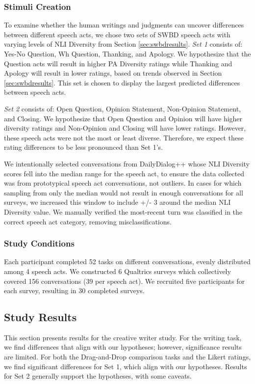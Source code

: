 \documentclass[11pt]{article}
\newcommand{\edivshortspace}{PA Diversity }
\begin{document}
\subsubsection{Stimuli Creation}
To examine whether the human writings and judgments can uncover differences between different speech acts, we chose two sets of SWBD speech acts
with varying levels of NLI Diversity from Section \ref{sec:swbdresults}.  
\textit{Set 1} consists of:  Yes-No Question, Wh Question, Thanking, and Apology.  We hypothesize that the Question acts will result in higher \edivshortspace ratings while Thanking and Apology will result in lower ratings, based on trends observed in Section \ref{sec:swbdresults}.  
This set is chosen to display the largest predicted differences between speech acts.

\textit{Set 2} consists of:  Open Question, Opinion Statement, Non-Opinion Statement, and Closing.  We hypothesize that Open Question and Opinion will have higher diversity ratings and Non-Opinion and Closing will have lower ratings.  However, these speech acts were not the most or least diverse.
Therefore, we expect these rating differences to be less pronounced than Set 1's.

We intentionally selected conversations from DailyDialog++ whose NLI Diversity scores
fell into the median range for the speech act, to 
ensure the data collected was from prototypical speech act conversations, not  outliers.  In cases for which sampling from only the median would not result in enough conversations for all surveys, we increased this window to include +/- 3 around the median NLI Diversity value. 
We manually verified the most-recent  turn was classified in the correct speech act category, removing misclassifications.

\subsubsection{Study Conditions}

Each participant completed 52 tasks on different conversations,  evenly distributed among 4 speech acts. 
We constructed 6 Qualtrics surveys which collectively covered 156 conversations (39 per speech act).
We recruited five participants for each survey, resulting in 30 completed surveys. 


\subsection{ Study Results}\label{sec:writer_results}
This section presents results for the 
creative writer study.
For the writing task, we find differences that align with our hypotheses; however, significance results are limited.
For both the Drag-and-Drop comparison tasks and the Likert ratings,  we find significant differences for Set 1,  which align with our hypotheses.  Results for Set 2 generally support the hypotheses, with some caveats.  
\end{document}
